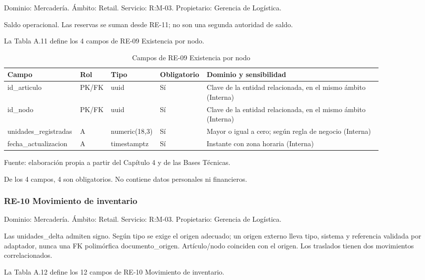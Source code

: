 \documentclass[11pt]{article}
\begin{document}
Dominio: Mercadería. Ámbito: Retail. Servicio: R:M-03. Propietario: Gerencia de Logística.

Saldo operacional. Las reservas se suman desde RE-11; no son una segunda autoridad de saldo.

La Tabla A.11 define los 4 campos de RE-09 Existencia por nodo.

\clearpage

\begin{table}[htbp]
\caption{Campos de RE-09 Existencia por nodo}\label{tab:d_re09}
\centering
\begin{tabular}{@{}p{0.167\linewidth}p{0.070\linewidth}p{0.079\linewidth}p{0.097\linewidth}p{0.465\linewidth}@{}}
\toprule Campo & Rol & Tipo & Obligatorio & Dominio y sensibilidad \\
\midrule
id\_articulo & PK/FK & uuid & Sí & Clave de la entidad relacionada, en el mismo ámbito (Interna) \\
id\_nodo & PK/FK & uuid & Sí & Clave de la entidad relacionada, en el mismo ámbito (Interna) \\
unidades\_registradas & A & numeric(18,3) & Sí & Mayor o igual a cero; según regla de negocio (Interna) \\
fecha\_actualizacion & A & timestamptz & Sí & Instante con zona horaria (Interna) \\
\bottomrule
\end{tabular}
\par\smallskip
{\raggedright Fuente: elaboración propia a partir del Capítulo 4 y de las Bases Técnicas.\par}
\end{table}


De los 4 campos, 4 son obligatorios. No contiene datos personales ni financieros.

\subsubsection{RE-10 Movimiento de inventario}

Dominio: Mercadería. Ámbito: Retail. Servicio: R:M-03. Propietario: Gerencia de Logística.

Las unidades\_delta admiten signo. Según tipo se exige el origen adecuado; un origen externo lleva tipo, sistema y referencia validada por adaptador, nunca una FK polimórfica documento\_origen. Artículo/nodo coinciden con el origen. Los traslados tienen dos movimientos correlacionados.

La Tabla A.12 define los 12 campos de RE-10 Movimiento de inventario.
\end{document}
